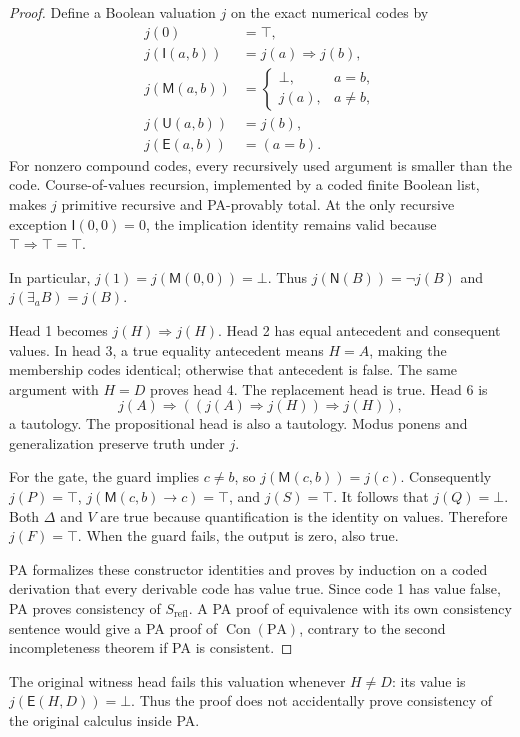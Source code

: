\documentclass[11pt,a4paper]{article}
\newcommand{\PA}{\mathrm{PA}}
\newcommand{\Con}{\operatorname{Con}}
\newcommand{\NN}{\mathsf{N}}
\newcommand{\UU}{\mathsf{U}}
\newcommand{\EE}{\mathsf{E}}
\newcommand{\MM}{\mathsf{M}}
\newcommand{\II}{\mathsf{I}}
\begin{document}
\begin{proof}
Define a Boolean valuation $j$ on the exact numerical codes by
\begin{align*}
j(0)&=\top,\\
j(\II(a,b))&=j(a)\Rightarrow j(b),\\
j(\MM(a,b))&=\begin{cases}\bot,&a=b,\\j(a),&a\ne b,\end{cases}\\
j(\UU(a,b))&=j(b),\\
j(\EE(a,b))&=(a=b).
\end{align*}
For nonzero compound codes, every recursively used argument is smaller than the code. Course-of-values recursion, implemented by a coded finite Boolean list, makes $j$ primitive recursive and PA-provably total. At the only recursive exception $\II(0,0)=0$, the implication identity remains valid because $\top\Rightarrow\top=\top$.

In particular, $j(1)=j(\MM(0,0))=\bot$. Thus $j(\NN(B))=\neg j(B)$ and $j(\exists_aB)=j(B)$.

Head 1 becomes $j(H)\Rightarrow j(H)$. Head 2 has equal antecedent and consequent values. In head 3, a true equality antecedent means $H=A$, making the membership codes identical; otherwise that antecedent is false. The same argument with $H=D$ proves head 4. The replacement head is true. Head 6 is
\[
j(A)\Rightarrow((j(A)\Rightarrow j(H))\Rightarrow j(H)),
\]
a tautology. The propositional head is also a tautology. Modus ponens and generalization preserve truth under $j$.

For the gate, the guard implies $c\ne b$, so
$j(\MM(c,b))=j(c)$. Consequently $j(P)=\top$,
$j(\MM(c,b)\to c)=\top$, and $j(S)=\top$. It follows that
$j(Q)=\bot$. Both $\Delta$ and $V$ are true because quantification is the identity on values. Therefore $j(F)=\top$. When the guard fails, the output is zero, also true.

PA formalizes these constructor identities and proves by induction on a coded derivation that every derivable code has value true. Since code 1 has value false, PA proves consistency of $S_{\mathrm{refl}}$. A PA proof of equivalence with its own consistency sentence would give a PA proof of $\Con(\PA)$, contrary to the second incompleteness theorem if PA is consistent.
\end{proof}

The original witness head fails this valuation whenever $H\ne D$: its value is $j(\EE(H,D))=\bot$. Thus the proof does not accidentally prove consistency of the original calculus inside PA.
\end{document}
